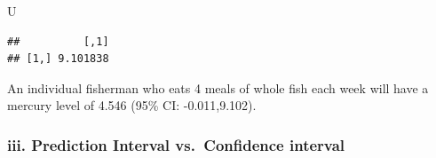 \documentclass[]{article}
\newenvironment{Shaded}{\begin{snugshade}}{\end{snugshade}}
\newcommand{\NormalTok}[1]{#1}
\begin{document}
\begin{Shaded}
\begin{Highlighting}[]
\NormalTok{U}
\end{Highlighting}
\end{Shaded}

\begin{verbatim}
##          [,1]
## [1,] 9.101838
\end{verbatim}

An individual fisherman who eats 4 meals of whole fish each week will
have a mercury level of 4.546 (95\% CI: -0.011,9.102).

\hypertarget{iii.-prediction-interval-vs.confidence-interval}{%
\subsubsection{iii. Prediction Interval vs.~Confidence
interval}\label{iii.-prediction-interval-vs.confidence-interval}}
\end{document}

